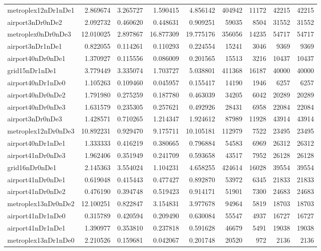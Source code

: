 \begin{longtable}{|l|r|r|r|r|r|r|r|r|}
metroplex12nDr1nDe1 & 2.869674 & 3.265727 & 1.590415 & 4.856142 & 404942 & 11172 & 42215 & 42215 \\
airport3nDr0nDe2 & 2.092732 & 0.460620 & 0.448631 & 0.909251 & 59035 & 8504 & 31552 & 31552 \\
metroplex0nDr0nDe3 & 12.010025 & 2.897867 & 16.877309 & 19.775176 & 356056 & 14235 & 54717 & 54717 \\
airport3nDr1nDe1 & 0.822055 & 0.114261 & 0.110293 & 0.224554 & 15241 & 3046 & 9369 & 9369 \\
airport40nDr0nDe1 & 1.370927 & 0.115556 & 0.086009 & 0.201565 & 15513 & 3216 & 10437 & 10437 \\
grid15nDr1nDe1 & 3.779449 & 3.335074 & 1.703727 & 5.038801 & 411368 & 16187 & 40000 & 40000 \\
airport40nDr1nDe0 & 1.105263 & 0.109460 & 0.045957 & 0.155417 & 14190 & 1946 & 6257 & 6257 \\
airport40nDr0nDe2 & 1.791980 & 0.275259 & 0.187780 & 0.463039 & 34205 & 6042 & 20289 & 20289 \\
airport40nDr0nDe3 & 1.631579 & 0.235305 & 0.257621 & 0.492926 & 28431 & 6958 & 22084 & 22084 \\
airport3nDr0nDe3 & 1.428571 & 0.710265 & 1.214347 & 1.924612 & 87989 & 11928 & 43914 & 43914 \\
metroplex12nDr0nDe3 & 10.892231 & 0.929470 & 9.175711 & 10.105181 & 112979 & 7522 & 23495 & 23495 \\
airport40nDr1nDe1 & 1.333333 & 0.416219 & 0.380665 & 0.796884 & 54583 & 6969 & 26312 & 26312 \\
airport41nDr0nDe3 & 1.962406 & 0.351949 & 0.241709 & 0.593658 & 43517 & 7952 & 26128 & 26128 \\
grid16nDr0nDe1 & 2.145363 & 3.554024 & 1.104231 & 4.658255 & 424614 & 16028 & 39554 & 39554 \\
airport41nDr0nDe1 & 0.619048 & 0.415443 & 0.477427 & 0.892870 & 53972 & 6345 & 21833 & 21833 \\
airport41nDr0nDe2 & 0.476190 & 0.394748 & 0.519423 & 0.914171 & 51901 & 7300 & 24683 & 24683 \\
metroplex13nDr0nDe2 & 12.100251 & 0.822847 & 3.154831 & 3.977678 & 94964 & 5819 & 18703 & 18703 \\
airport41nDr1nDe0 & 0.315789 & 0.420594 & 0.209490 & 0.630084 & 55547 & 4937 & 16727 & 16727 \\
airport41nDr1nDe1 & 1.390977 & 0.353810 & 0.237818 & 0.591628 & 46679 & 5491 & 19038 & 19038 \\
metroplex13nDr1nDe0 & 2.210526 & 0.159681 & 0.042067 & 0.201748 & 20520 & 972 & 2136 & 2136 \\

\end{longtable}
